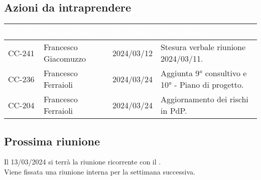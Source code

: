 \subsection{Azioni da intraprendere}
{
    \setlength{\tabcolsep}{10pt}
            \renewcommand{\arraystretch}{1.5}
            \begin{xltabular}{\textwidth}{| l | l | l | X |}
                 \hline
                 \textbf{\textcolor{white}{Codice }} & \textbf{\textcolor{white}{Assegnatario}} & \textbf{\textcolor{white}{Scadenza}} & \textbf{\textcolor{white}{Descrizione}} \\
                 \hline
                 CC-241 & Francesco Giacomuzzo & 2024/03/12 & Stesura verbale riunione 2024/03/11.\\
                 \hline
                 CC-236 & Francesco Ferraioli & 2024/03/24 & Aggiunta 9° consultivo e 10°  - Piano di progetto.\\
                 \hline
                 CC-204 & Francesco Ferraioli & 2024/03/24 & Aggiornamento dei rischi in PdP.\\
                 \hline
                 
            \end{xltabular}
}

\subsection{Prossima riunione} \label{subsec:riunione}
Il 13/03/2024 si terrà la riunione ricorrente con il . \\ 
Viene fissata una riunione interna per la settimana successiva.
